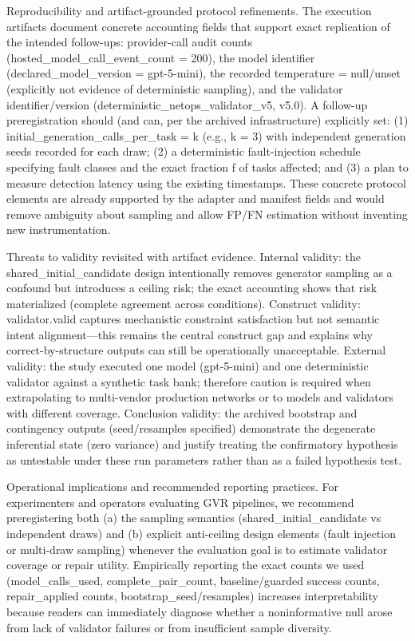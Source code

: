 \documentclass[conference]{IEEEtran}
\begin{document}
Reproducibility and artifact-grounded protocol refinements. The execution artifacts document concrete accounting fields that support exact replication of the intended follow-ups: provider-call audit counts (hosted\_model\_call\_event\_count = 200), the model identifier (declared\_model\_version = gpt-5-mini), the recorded temperature = null/unset (explicitly not evidence of deterministic sampling), and the validator identifier/version (deterministic\_netops\_validator\_v5, v5.0). A follow-up preregistration should (and can, per the archived infrastructure) explicitly set: (1) initial\_generation\_calls\_per\_task = k (e.g., k = 3) with independent generation seeds recorded for each draw; (2) a deterministic fault-injection schedule specifying fault classes and the exact fraction f of tasks affected; and (3) a plan to measure detection latency using the existing timestamps. These concrete protocol elements are already supported by the adapter and manifest fields and would remove ambiguity about sampling and allow FP/FN estimation without inventing new instrumentation.

Threats to validity revisited with artifact evidence. Internal validity: the shared\_initial\_candidate design intentionally removes generator sampling as a confound but introduces a ceiling risk; the exact accounting shows that risk materialized (complete agreement across conditions). Construct validity: validator.valid captures mechanistic constraint satisfaction but not semantic intent alignment---this remains the central construct gap and explains why correct-by-structure outputs can still be operationally unacceptable. External validity: the study executed one model (gpt-5-mini) and one deterministic validator against a synthetic task bank; therefore caution is required when extrapolating to multi-vendor production networks or to models and validators with different coverage. Conclusion validity: the archived bootstrap and contingency outputs (seed/resamples specified) demonstrate the degenerate inferential state (zero variance) and justify treating the confirmatory hypothesis as untestable under these run parameters rather than as a failed hypothesis test.

Operational implications and recommended reporting practices. For experimenters and operators evaluating GVR pipelines, we recommend preregistering both (a) the sampling semantics (shared\_initial\_candidate vs independent draws) and (b) explicit anti-ceiling design elements (fault injection or multi-draw sampling) whenever the evaluation goal is to estimate validator coverage or repair utility. Empirically reporting the exact counts we used (model\_calls\_used, complete\_pair\_count, baseline/guarded success counts, repair\_applied counts, bootstrap\_seed/resamples) increases interpretability because readers can immediately diagnose whether a noninformative null arose from lack of validator failures or from insufficient sample diversity.
\end{document}
